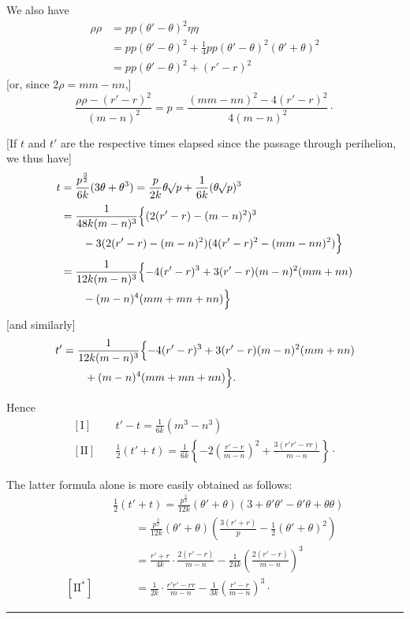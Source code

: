 We also have
\[
\begin{aligned}
\rho\rho&=pp(\theta'-\theta)^2\eta\eta\\
&=pp(\theta'-\theta)^2+\tfrac{1}{4}pp(\theta'-\theta)^2(\theta'+\theta)^2\\
&=pp(\theta'-\theta)^2+(r'-r)^2
\end{aligned}
\]
[or, since \(2\rho=mm-nn\),]
\[
\frac{\rho\rho-(r'-r)^2}{(m-n)^2}=p=\frac{(mm-nn)^2-4(r'-r)^2}{4(m-n)^2}\mathpunct{\cdot}
\]

[If \(t\) and \(t'\) are the respective times elapsed since the passage through perihelion, we thus have]
\[
\begin{aligned}
t&=\frac{p^{\frac{3}{2}}}{6k}(3\theta+\theta^3)=\frac{p}{2k}\theta\mathord{{}^{}\!\surd}p+\frac{1}{6k}(\theta\mathord{{}^{}\!\surd}p)^3\\[.5ex]
&=\frac{1}{48k(m-n)^3}\Bigl\{(2(r'-r)-(m-n)^2)^3\\
&\qquad-3(2(r'-r)-(m-n)^2)(4(r'-r)^2-(mm-nn)^2)\Bigr\}\\[.5ex]
&=\frac{1}{12k(m-n)^3}\Bigl\{-4(r'-r)^3+3(r'-r)(m-n)^2(mm+nn)\\
&\qquad-(m-n)^4(mm+mn+nn)\Bigr\}
\end{aligned}
\]
[and similarly]
\[
\begin{aligned}
t'&=\frac{1}{12k(m-n)^3}\Bigl\{-4(r'-r)^3+3(r'-r)(m-n)^2(mm+nn)\\
&\qquad+(m-n)^4(mm+mn+nn)\Bigr\}.
\end{aligned}
\]

Hence
\[
\begin{aligned}
\mathrm{[I]}\quad&t'-t=\frac{1}{6k}(m^3-n^3)\\[1ex]
\mathrm{[II]}\quad&\tfrac{1}{2}(t'+t)=\frac{1}{6k}\left\{-2\left(\frac{r'-r}{m-n}\right)^2+\frac{3(r'r'-rr)}{m-n}\right\}\mathpunct{\cdot}
\end{aligned}
\]

The latter formula alone is more easily obtained as follows:
\[
\begin{aligned}
&\tfrac{1}{2}(t'+t)=\frac{p^{\frac{3}{2}}}{12k}(\theta'+\theta)(3+\theta'\theta'-\theta'\theta+\theta\theta)\\
&\qquad=\frac{p^{\frac{3}{2}}}{12k}(\theta'+\theta)\left(\frac{3(r'+r)}{p}-\tfrac{1}{2}(\theta'+\theta)^2\right)\\[.5ex]
&\qquad=\frac{r'+r}{4k}\cdot\frac{2(r'-r)}{m-n}-\frac{1}{24k}\left(\frac{2(r'-r)}{m-n}\right)^3\\[.5ex]
\mathrm{[II^{*}]}\quad&\qquad=\frac{1}{2k}\cdot\frac{r'r'-rr}{m-n}-\frac{1}{3k}\left(\frac{r'-r}{m-n}\right)^3\mathpunct{\cdot}
\end{aligned}
\]
\begin{center}\rule{.3\linewidth}{.4pt}\end{center}
